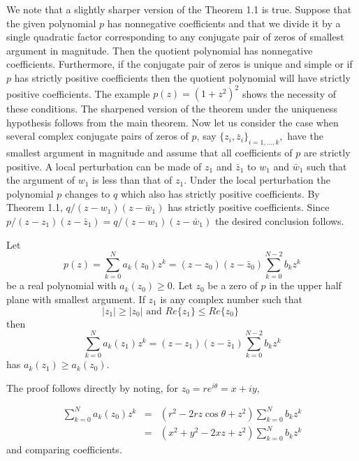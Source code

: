 \begin{remark} We note that a slightly sharper version
of the Theorem 1.1 is true.  Suppose that the given polynomial $p$
has nonnegative coefficients and that we divide it by a single quadratic
factor corresponding to any conjugate pair of zeros of smallest
argument in magnitude.  Then the quotient polynomial has nonnegative
coefficients.  Furthermore, if the conjugate pair of zeros is unique
 and simple or if $p$ has strictly positive coefficients
then the quotient polynomial will have strictly positive
coefficients.  The example $p(z) = (1 + z^{2})^{2}$ shows the
necessity of these conditions.  The sharpened version of the theorem
under the uniqueness hypothesis follows from the main theorem.  Now
let us consider the case when several complex conjugate pairs of
zeros of $p$, say $\{ z_{i} , \bar{z}_{i} \}_{i=1, \ldots, k},$ have
the smallest argument in magnitude and assume that all
coefficients of $p$ are strictly positive.  A local
perturbation can be made of $z_{1}$ and $\bar{z}_{1}$ to $w_{1}$ and
$\bar{w}_{1}$ such that the argument of $w_{1}$ is less than that of
$z_1 $.  Under the local perturbation the polynomial $p$ changes to
$q$ which also has strictly positive coefficients. By Theorem 1.1, $q
/{(z-w_{1})(z-\bar{w}_{1})} $ has strictly positive coefficients.
Since $p/{(z-z_{1})(z-\bar{z}_{1})} = q/{(z-w_{1})(z-\bar{w}_{1})}$
the desired conclusion follows.  \end{remark}

\begin{corollary} Let $$p(z) = \sum^{N}_{k=0} a_{k} (z_{0}) z^{k} =
(z-z_{0})(z-\bar{z}_{0}) \sum^{N-2}_{k=0} b_{k} z^{k}$$ be a real
polynomial with $a_{k} (z_{0}) \geq 0.$ Let $z_{0}$ be a zero of $p$
in the upper half plane with smallest argument.  If $z_{1}$ is any
complex number such that $$|z_{1}| \geq |z_{0}| \mbox{ and } Re \{
z_{1} \} \leq Re \{ z_{0} \} \ \ \ \ \ \ \ \ \ \ \ $$ then
$$\sum^{N}_{k=0} a_{k} (z_{1} ) z^{k} = (z-z_{1}) (z-\bar{z}_{1})
\sum^{N-2}_{k=0} b_{k} z^{k} $$ has $a_{k} (z_{1}) \geq a_{k}
(z_{0})$. \end{corollary}

 The proof follows directly by noting, for $ z_0  =  r e^{i\theta}=x + iy $,

\begin{eqnarray*}
 \sum^N_{k=0}
a_k(z_0)z^k & = & (r^2-2{r}z\cos{\theta} +z^2)\sum^N_{k=0} b_kz^k \\ &  = & (x^2+y^2 -2xz+z^2)\sum^N_{k=0} b_kz^k\end{eqnarray*}
and comparing coefficients.



